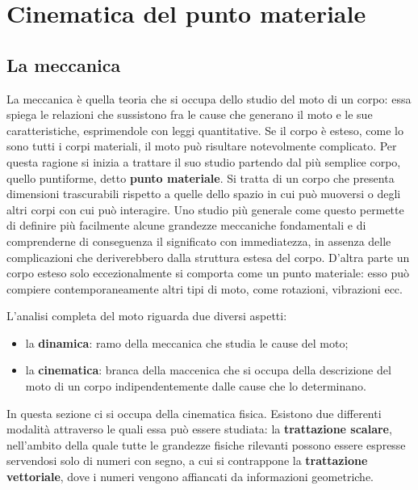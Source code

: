 \documentclass[10pt,a4paper]{book}
\begin{document}
\chapter{Cinematica del punto materiale}

\section{La meccanica}

La meccanica è quella teoria che si occupa dello studio del moto di un corpo: essa spiega le relazioni che sussistono fra le cause che generano il moto e le sue caratteristiche, esprimendole con leggi quantitative. Se il corpo è esteso, come lo sono tutti i corpi materiali, il moto può risultare notevolmente complicato. Per questa ragione si inizia a trattare il suo studio partendo dal più semplice corpo, quello puntiforme, detto \textbf{punto materiale}. Si tratta di un corpo che presenta dimensioni trascurabili rispetto a quelle dello spazio in cui può muoversi o degli altri corpi con cui può interagire. Uno studio più generale come questo permette di definire più facilmente alcune grandezze meccaniche fondamentali e di comprenderne di conseguenza il significato con immediatezza, in assenza delle complicazioni che deriverebbero dalla struttura estesa del corpo. D'altra parte un corpo esteso solo eccezionalmente si comporta come un punto materiale: esso può compiere contemporaneamente altri tipi di moto, come rotazioni, vibrazioni ecc.

L'analisi completa del moto riguarda due diversi aspetti:
\begin{itemize}
	\item la \textbf{dinamica}: ramo della meccanica che studia le cause del moto;
	\item la \textbf{cinematica}: branca della maccenica che si occupa della descrizione del moto di un corpo indipendentemente dalle cause che lo determinano.
\end{itemize}
In questa sezione ci si occupa della cinematica fisica. Esistono due differenti modalità attraverso le quali essa può essere studiata: la \textbf{trattazione scalare}, nell'ambito della quale tutte le grandezze fisiche rilevanti possono essere espresse servendosi solo di numeri con segno, a cui si contrappone la \textbf{trattazione vettoriale}, dove i numeri vengono affiancati da informazioni geometriche.
\end{document}
